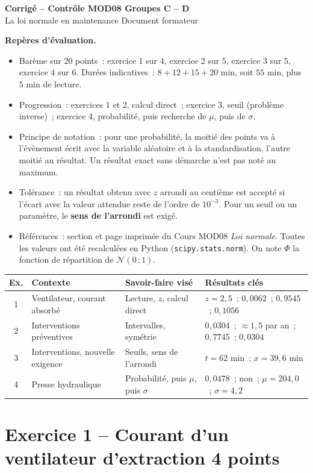 \documentclass[a4paper,11pt]{article}
\newcommand{\LN}{Cours MOD08 \textit{Loi normale}}
\newcommand{\GRP}{C -- D}
\newcommand{\RECAP}{%
1 & Ventilateur, courant absorbé & Lecture, $z$, calcul direct & $z = 2{,}5$~; $0{,}0062$~; $0{,}9545$~; $0{,}1056$ \\
2 & Interventions préventives & Intervalles, symétrie & $0{,}0304$~; $\approx 1{,}5$ par an~; $0{,}7745$~; $0{,}0304$ \\
3 & Interventions, nouvelle exigence & Seuils, sens de l'arrondi & $t = 62$ min~; $x = 39{,}6$ min \\
4 & Presse hydraulique & Probabilité, puis $\mu$, puis $\sigma$ & $0{,}0478$~; non~; $\mu = 204{,}0$~; $\sigma = 4{,}2$ \\
}
\begin{document}
\begin{tcolorbox}[colback=uimmblue, colframe=uimmblue, sharp corners, boxrule=0pt,
  left=14pt, right=14pt, top=8pt, bottom=8pt]
{\color{white}\LARGE\bfseries Corrigé -- Contrôle MOD08 \hfill Groupes \GRP}\\[3pt]
{\color{white}\large La loi normale en maintenance \hfill Document formateur}
\end{tcolorbox}

\begin{consigne}\small
\textbf{Repères d'évaluation.}
\begin{itemize}[leftmargin=12pt, itemsep=1pt, topsep=2pt]
  \item Barème sur $20$ points~: exercice 1 sur $4$, exercice 2 sur $5$, exercice 3 sur $5$, exercice 4 sur $6$. Durées indicatives~: $8 + 12 + 15 + 20$ min, soit $55$ min, plus $5$ min de lecture.
  \item Progression~: exercices 1 et 2, calcul direct~; exercice 3, seuil (problème inverse)~; exercice 4, probabilité, puis recherche de $\mu$, puis de $\sigma$.
  \item Principe de notation~: pour une probabilité, la moitié des points va à l'évènement écrit avec la variable aléatoire et à la standardisation, l'autre moitié au résultat. Un résultat exact sans démarche n'est pas noté au maximum.
  \item Tolérance~: un résultat obtenu avec $z$ arrondi au centième est accepté si l'écart avec la valeur attendue reste de l'ordre de $10^{-3}$. Pour un seuil ou un paramètre, le \textbf{sens de l'arrondi} est exigé.
  \item Références~: section et page imprimée du \LN{}. Toutes les valeurs ont été recalculées en Python (\texttt{scipy.stats.norm}). On note $\Phi$ la fonction de répartition de $\mathcal{N}(0\,;1)$.
\end{itemize}
\end{consigne}

\begin{center}\small
\renewcommand{\arraystretch}{1.2}
\begin{tabular}{clll}
\toprule
\textbf{Ex.} & \textbf{Contexte} & \textbf{Savoir-faire visé} & \textbf{Résultats clés} \\
\midrule
\RECAP
\bottomrule
\end{tabular}
\end{center}


\section{Exercice 1 -- Courant d'un ventilateur d'extraction \hfill {\normalsize\color{uimmred}4 points}}
\end{document}
